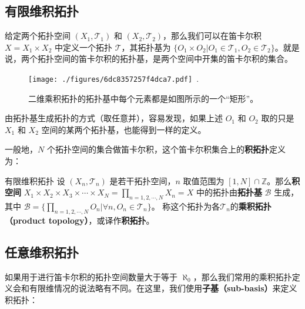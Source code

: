 

\subsection{有限维积拓扑}

给定两个拓扑空间 $(X_1, \mathcal{T}_1)$ 和 $(X_2, \mathcal{T}_2)$，那么我们可以在笛卡尔积 $X=X_1\times X_2$ 中定义一个拓扑 $\mathcal{T}$，其拓扑基为 $\{O_1\times O_2|O_1\in\mathcal{T_1}, O_2\in\mathcal{T_2}\}$。就是说，两个拓扑空间的笛卡尔积的拓扑基，是两个空间中开集的笛卡尔积的集合。

\begin{figure}[ht]
\centering
\texttt{[image: ./figures/6dc8357257f4dca7.pdf]}~.
\caption{二维乘积拓扑的拓扑基中每个元素都是如图所示的一个“矩形”。} \label{fig_Topo6_2}
\end{figure}

由拓扑基生成拓扑的方式（取任意并），容易发现，如果上述 $O_1$ 和 $O_2$ 取的只是 $X_1$ 和 $X_2$ 空间的某两个拓扑基，也能得到一样的定义。

一般地，$N$ 个拓扑空间的集合做笛卡尔积，这个笛卡尔积集合上的\textbf{积拓扑}定义为：

\begin{definition}{有限维积拓扑}
设 $(X_n, \mathcal{T}_n)$ 是若干拓扑空间，$n$ 取值范围为 $[1, N]\cap\mathbb{Z}$。那么\textbf{积空间} $X_1\times X_2\times X_3\times\cdots\times X_N=\prod\limits_{n=1,2,\cdots,N}X_n=X$ 中的拓扑由\textbf{拓扑基} $\mathcal{B}$ 生成，其中 $\mathcal{B}=\{\prod\limits_{n=1,2,\cdots,N}O_n|\forall n, O_n\in\mathcal{T}_n\}$。
称这个拓扑为各$\mathcal{T}_n$的\textbf{乘积拓扑（product topology）}，或译作\textbf{积拓扑}。
\end{definition}

\subsection{任意维积拓扑}

如果用于进行笛卡尔积的拓扑空间数量大于等于 $\aleph_0$，那么我们常用的乘积拓扑定义会和有限维情况的说法略有不同。在这里，我们使用\textbf{子基（sub-basis）}来定义积拓扑：

